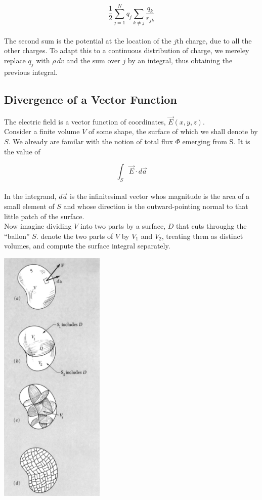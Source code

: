 \documentclass[svgnames]{article}
\begin{document}
\[ \frac{1}{2} \sum_{j=1}^N q_j \sum_{k\neq j} \frac{q_k}{r_{jk}} \] \\

The second sum is the potential at the location of the $j$th charge, due to all the other charges. To adapt this to a continuous distribution of charge, we mereley replace $q_j$ with $\rho \, dv$ and the sum over $j$ by an integral, thus obtaining the previous integral. \\

\subsection{Divergence of a Vector Function} 

The electric field is a vector function of coordinates, $\vec{E}(x, y, z)$. \\ 

Consider a finite volume $V$ of some shape, the surface of which we shall denote by $S$. We already are familar with the notion of total flux $\Phi$ emerging from S. It is the value of 

\[ \int_S \vec{E} \cdot d\vec{a} \] \\

In the integrand, $d\vec{a}$ is the infinitesimal vector whos magnitude is the area of a small element of $S$ and whose direction is the outward-pointing normal to that little patch of the surface. \\

Now imagine dividing $V$ into two parts by a surface, $D$ that cuts throughg the ``ballon'' $S$. denote the two parts of $V$ by $V_1$ and $V_2$, treating them as distinct volumes, and compute the surface integral separately. 

\begin{center}
\includegraphics[width = 50mm]{ss12.png}
\end{center} 
\end{document}
